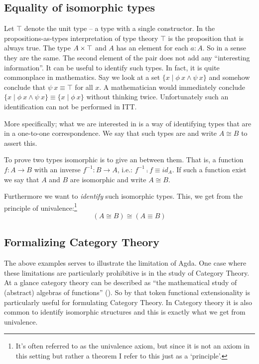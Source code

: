 \documentclass{article}
\begin{document}
\subsection{Equality of isomorphic types}
%
Let $\top$ denote the unit type -- a type with a single constructor. In the
propositions-as-types interpretation of type theory $\top$ is the proposition
that is always true. The type $A \times \top$ and $A$ has an element for each $a :
A$. So in a sense they are the same. The second element of the pair does not add
any ``interesting information''. It can be useful to identify such types. In
fact, it is quite commonplace in mathematics. Say we look at a set $\{x \mid
\phi\ x \land \psi\ x\}$ and somehow conclude that $\psi\ x \equiv \top$ for all
$x$. A mathematician would immediately conclude $\{x \mid \phi\ x \land
\psi\ x\} \equiv \{x \mid \phi\ x\}$ without thinking twice. Unfortunately such
an identification can not be performed in ITT.

More specifically; what we are interested in is a way of identifying types that
are in a one-to-one correspondence. We say that such types are
 and write $A \cong B$ to assert this.

To prove two types isomorphic is to give an  between them.
That is, a function $f : A \to B$ with an inverse $f^{-1} : B \to A$, i.e.:
$f^{-1} \comp f \equiv id_A$. If such a function exist we say that $A$ and $B$
are isomorphic and write $A \cong B$.

Furthermore we want to \emph{identify} such isomorphic types. This, we get from
the principle of univalence:\footnote{It's often referred to as the univalence
axiom, but since it is not an axiom in this setting but rather a theorem I
refer to this just as a `principle'.}
%
$$(A \cong B) \cong (A \equiv B)$$
%
\subsection{Formalizing Category Theory}
%
The above examples serves to illustrate the limitation of Agda. One case where
these limitations are particularly prohibitive is in the study of Category
Theory. At a glance category theory can be described as ``the mathematical study
of (abstract) algebras of functions'' (\cite{awodey-2006}). So by that token
functional extensionality is particularly useful for formulating Category
Theory. In Category theory it is also common to identify isomorphic structures
and this is exactly what we get from univalence.
\end{document}
